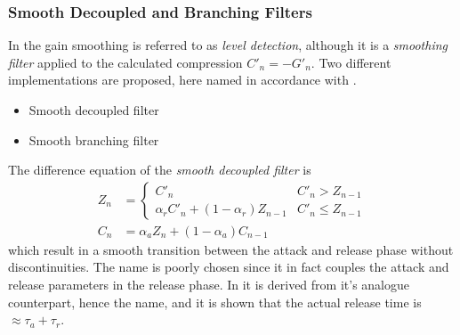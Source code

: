 \documentclass[../main2.tex]{subfiles}
\begin{document}
\subsubsection{Smooth Decoupled and Branching Filters}
In \cite{reiss2012tutorial} the gain smoothing is referred to as \emph{level detection}, although it is a \emph{smoothing filter} applied to the calculated compression $C'_n = -G'_n$. Two different implementations are proposed, here named in accordance with \cite{reiss2012tutorial}.
\begin{itemize}
\item{Smooth decoupled filter}
\item{Smooth branching filter}
\end{itemize}
The difference equation of the \emph{smooth decoupled filter} is
\begin{equation}\label{eq:smooth_decoupled_det}
\begin{split}
Z_n &= \begin{cases}
   C'_n								& C'_n > Z_{n-1} \\
    \alpha_{r} C'_n + (1-\alpha_{r}) Z_{n-1} 	& C'_n \leq Z_{n-1}
\end{cases} \\
C_n &= \alpha_{a} Z_n + (1-\alpha_{a}) C_{n-1}
\end{split}
\end{equation}
which result in a smooth transition between the attack and release phase without discontinuities. The name is poorly chosen since it in fact couples the attack and release parameters in the release phase. In \cite{reiss2012tutorial} it is derived from it's analogue counterpart, hence the name, and it is shown that the actual release time is $\approx \tau_a + \tau_r$.
\end{document}
